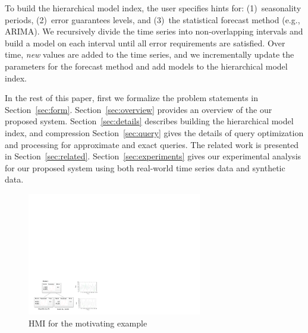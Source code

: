 To build the hierarchical model index, the user specifies hints for: (1)~seasonality periods, (2)~error guarantees levels, and (3)~the statistical forecast method (e.g., ARIMA).  
We recursively divide the time series into non-overlapping intervals and build a model on each interval until all error requirements are satisfied. 
Over time, {\it new} values are added to the time series, and we incrementally update the parameters for the forecast method and add  models to the hierarchical model index.

In the rest of this paper, first we formalize the problem statements in Section~\ref{sec:form}.   Section~\ref{sec:overview} provides an overview of the our proposed system. Section~\ref{sec:details} describes building the hierarchical model index, and  compression Section~\ref{sec:query} gives the details of query optimization and processing for approximate and exact queries.  The  related work is presented in Section~\ref{sec:related}. Section~\ref{sec:experiments} gives  our experimental analysis for our proposed system   using  both real-world time series data and synthetic data.


\begin{figure}[th]
\center
\includegraphics[width=3in]{figs/example_tree.pdf}
\caption{HMI for the motivating example}
\label{fig:exampletree}
\end{figure} 


